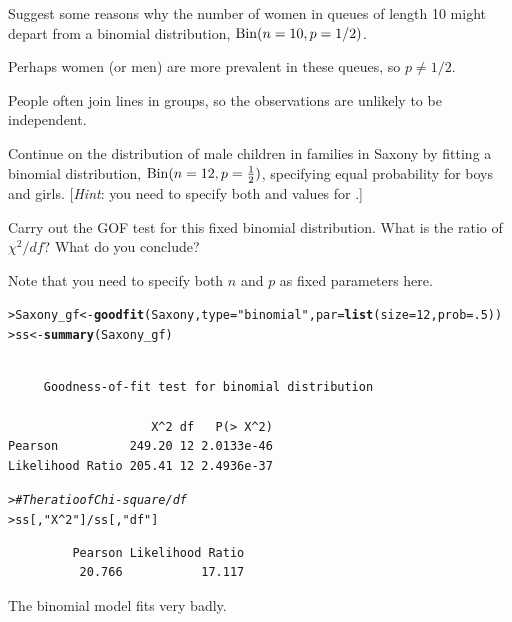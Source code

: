 \documentclass[10pt]{report}\usepackage[]{graphicx}\usepackage[]{color}
\makeatletter
\newcommand{\hlnum}[1]{\textcolor[rgb]{0.686,0.059,0.569}{#1}}%
\newcommand{\hlstr}[1]{\textcolor[rgb]{0.192,0.494,0.8}{#1}}%
\newcommand{\hlcom}[1]{\textcolor[rgb]{0.678,0.584,0.686}{\textit{#1}}}%
\newcommand{\hlopt}[1]{\textcolor[rgb]{0,0,0}{#1}}%
\newcommand{\hlstd}[1]{\textcolor[rgb]{0.345,0.345,0.345}{#1}}%
\newcommand{\hlkwb}[1]{\textcolor[rgb]{0.69,0.353,0.396}{#1}}%
\newcommand{\hlkwc}[1]{\textcolor[rgb]{0.333,0.667,0.333}{#1}}%
\newcommand{\hlkwd}[1]{\textcolor[rgb]{0.737,0.353,0.396}{\textbf{#1}}}%
\newenvironment{kframe}{%
 \def\at@end@of@kframe{}%
 \ifinner\ifhmode%
  \def\at@end@of@kframe{\end{minipage}}%
  \begin{minipage}{\columnwidth}%
 \fi\fi%
 \def\FrameCommand##1{\hskip\@totalleftmargin \hskip-\fboxsep
 \colorbox{shadecolor}{##1}\hskip-\fboxsep
     \hskip-\linewidth \hskip-\@totalleftmargin \hskip\columnwidth}%
 \MakeFramed {\advance\hsize-\width
   \@totalleftmargin\z@ \linewidth\hsize
   \@setminipage}}%
 {\par\unskip\endMakeFramed%
 \at@end@of@kframe}
\newenvironment{knitrout}{}{} %
\renewenvironment{knitrout}{\small\renewcommand{\baselinestretch}{.85}}{} %
\makeatother
\begin{document}
\begin{Exercises}
\begin{enumerate*}
\begin{ans}
\begin{knitrout}
\end{knitrout}
    \end{ans}
    
    \item Suggest some reasons why the number of women in queues of length 10
    might depart from a binomial distribution, $\Bin(n=10, p=1/2)$.
    \begin{ans}
    \begin{itemize*}
      \item Perhaps women (or men) are more prevalent in these queues, so $p \ne 1/2$.
      \item People often join lines in groups, so the observations are unlikely to be independent.
    \end{itemize*}
    \end{ans}
    
  \end{enumerate*}

  \exercise Continue  on the distribution of male children in families
  in Saxony by fitting a binomial distribution, $\Bin(n=12, p=\frac12)$, specifying
  equal probability for boys and girls. [\emph{Hint}:  you need to specify both  and
   values for .]
  \begin{enumerate*}
    \item Carry out the GOF test for this fixed binomial distribution.
    What is the ratio of $\chi^2 / df$? What do you conclude?
    \begin{ans}
    Note that you need to specify both $n$ and $p$ as fixed parameters here.
\begin{knitrout}\footnotesize
{}\color{fgcolor}\begin{kframe}
\begin{alltt}
\hlstd{> }\hlstd{Saxony_gf} \hlkwb{<-}\hlkwd{goodfit}\hlstd{(Saxony,} \hlkwc{type} \hlstd{=} \hlstr{"binomial"}\hlstd{,} \hlkwc{par}\hlstd{=}\hlkwd{list}\hlstd{(}\hlkwc{size}\hlstd{=}\hlnum{12}\hlstd{,} \hlkwc{prob}\hlstd{=}\hlnum{.5}\hlstd{))}
\hlstd{> }\hlstd{ss} \hlkwb{<-}\hlkwd{summary}\hlstd{(Saxony_gf)}
\end{alltt}
\begin{verbatim}

	 Goodness-of-fit test for binomial distribution

                    X^2 df   P(> X^2)
Pearson          249.20 12 2.0133e-46
Likelihood Ratio 205.41 12 2.4936e-37
\end{verbatim}
\begin{alltt}
\hlstd{> }  \hlcom{#The ratio of Chi-square/df}
\hlstd{> }\hlstd{ss[,}\hlstr{"X^2"}\hlstd{]} \hlopt{/} \hlstd{ss[,}\hlstr{"df"}\hlstd{]}
\end{alltt}
\begin{verbatim}
         Pearson Likelihood Ratio 
          20.766           17.117 
\end{verbatim}
\end{kframe}
\end{knitrout}
    The binomial model fits very badly.
    \end{ans}
    

\end{enumerate*}
\end{Exercises}
\end{document}
